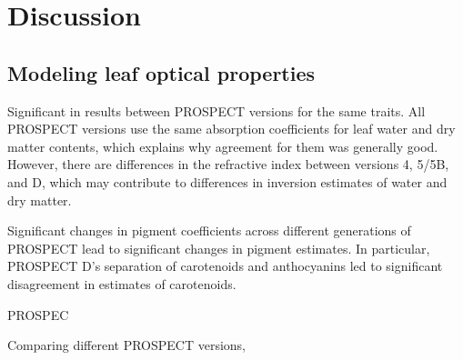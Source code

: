 \section{Discussion}

\subsection{Modeling leaf optical properties}

Significant in results between PROSPECT versions for the same traits.
All PROSPECT versions use the same absorption coefficients for leaf water and dry matter contents, which explains why agreement for them was generally good.
However, there are differences in the refractive index between versions 4, 5/5B, and D, which may contribute to differences in inversion estimates of water and dry matter.

Significant changes in pigment coefficients across different generations of PROSPECT lead to significant changes in pigment estimates.
In particular, PROSPECT D's separation of carotenoids and anthocyanins led to significant disagreement in estimates of carotenoids.

PROSPEC

Comparing different PROSPECT versions, 
